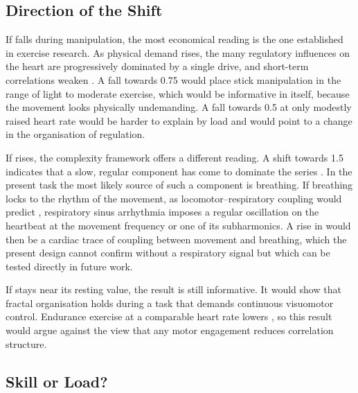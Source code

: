 \subsection{Direction of the Shift}
\label{sec:disc-direction}


If \al{} falls during manipulation, the most economical reading is the one established in exercise research. As physical demand rises, the many regulatory influences on the heart are progressively dominated by a single drive, and short-term correlations weaken \citep{gronwald2020review,gronwald2020biomarker}. A fall towards 0.75 would place stick manipulation in the range of light to moderate exercise, which would be informative in itself, because the movement looks physically undemanding. A fall towards 0.5 at only modestly raised heart rate would be harder to explain by load and would point to a change in the organisation of regulation.

If \al{} rises, the complexity framework offers a different reading. A shift towards 1.5 indicates that a slow, regular component has come to dominate the series \citep{goldberger2002}. In the present task the most likely source of such a component is breathing. If breathing locks to the rhythm of the movement, as locomotor--respiratory coupling would predict \citep{hoffmann2012,bardy2015}, respiratory sinus arrhythmia imposes a regular oscillation on the heartbeat at the movement frequency or one of its subharmonics. A rise in \al{} would then be a cardiac trace of coupling between movement and breathing, which the present design cannot confirm without a respiratory signal but which can be tested directly in future work.

If \al{} stays near its resting value, the result is still informative. It would show that fractal organisation holds during a task that demands continuous visuomotor control. Endurance exercise at a comparable heart rate lowers \al, so this result would argue against the view that any motor engagement reduces correlation structure.

\subsection{Skill or Load?}
\label{sec:disc-specificity}


